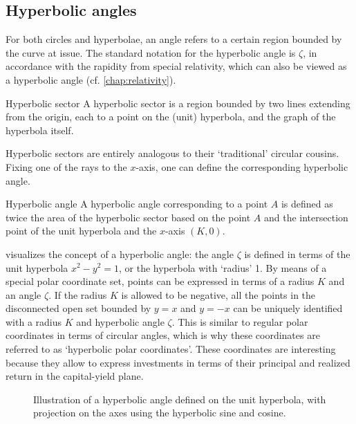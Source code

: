 \subsection{Hyperbolic angles}
For both circles and hyperbolae, an angle refers to a certain region bounded by the curve at issue. The standard notation for the hyperbolic angle is \(\zeta\), in accordance with the rapidity from special relativity, which can also be viewed as a hyperbolic angle (cf. \cref{chap:relativity}).
\begin{thmblock}{Hyperbolic sector}
A hyperbolic sector is a region bounded by two lines extending from the origin, each to a point on the (unit) hyperbola, and the graph of the hyperbola itself. 
\end{thmblock}
Hyperbolic sectors are entirely analogous to their `traditional' circular cousins. Fixing one of the rays to the \(x\)-axis, one can define the corresponding hyperbolic angle.
\begin{thmblock}{Hyperbolic angle}
A hyperbolic angle corresponding to a point \(A\) is defined as twice the area of the hyperbolic sector based on the point \(A\) and the intersection point of the unit hyperbola and the \(x\)-axis \((K, 0)\).
\end{thmblock}
 visualizes the concept of a hyperbolic angle: the angle $\zeta$ is defined in terms of the unit hyperbola $x^2 - y^2 = 1$, or the hyperbola with `radius' 1. 
By means of a special polar coordinate set, points can be expressed in terms of a radius $K$ and an angle $\zeta$. If the radius \(K\) is allowed to be negative, all the points in the disconnected open set bounded by \(y = x\) and \(y = -x\) can be uniquely identified with a radius \(K\) and hyperbolic angle \(\zeta\). This is similar to regular polar coordinates in terms of circular angles, which is why these coordinates are referred to as `hyperbolic polar coordinates'. These coordinates are interesting because they allow to express investments in terms of their principal and realized return in the capital-yield plane.

\begin{figure}[ht!]
    \centering
    
    \caption{Illustration of a hyperbolic angle defined on the unit hyperbola, with projection on the axes using the hyperbolic sine and cosine.}
    \label{fig:hyperbolic_angle}
\end{figure}

